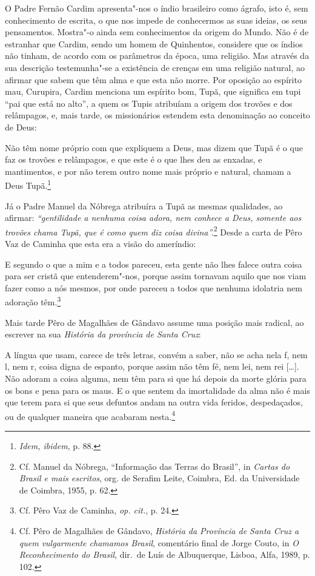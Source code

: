 O Padre Fernão Cardim apresenta"-nos o índio brasileiro como ágrafo,
isto é, sem conhecimento de escrita, o que nos impede de conhecermos as
suas ideias, os seus pensamentos. Mostra"-o ainda sem conhecimentos da
origem do Mundo. Não é de estranhar que Cardim, sendo um homem de
Quinhentos, considere que os índios não tinham, de acordo com os parâmetros
da época, uma religião. Mas através da sua descrição testemunha"-se a
existência de crenças em uma religião natural, ao afirmar que sabem que
têm alma e que esta não morre. Por oposição ao espírito mau,
Curupira, Cardim menciona um espírito bom, Tupã, que
significa em tupi ``pai que está no alto'', a quem os Tupis atribuíam a
origem dos trovões e dos relâmpagos, e, mais tarde, os missionários
estendem esta denominação ao conceito de Deus:

\begin{hedraquote}
Não têm nome próprio com que expliquem a Deus, mas dizem que
Tupã é o que faz os trovões e relâmpagos, e que este é o que lhes deu
as enxadas, e mantimentos, e por não terem outro nome mais próprio e
natural, chamam a Deus Tupã.\footnote{ \textit{Idem, ibidem}, p. 88.} 
\end{hedraquote}

Já o Padre Manuel da Nóbrega atribuíra a Tupã as mesmas qualidades,
ao afirmar: \textit{``gentilidade a nenhuma coisa adora, nem
conhece a Deus, somente aos trovões chama Tupã, que é como quem diz
coisa divina''.}\footnote{ Cf. Manuel da Nóbrega, ``Informação das
Terras do Brasil'', in \textit{Cartas do Brasil e mais escritos}, org.
de Serafim Leite, Coimbra, Ed. da Universidade de Coimbra, 1955, p.
62.} Desde a carta de Pêro Vaz de Caminha que esta era a
visão do ameríndio:

\begin{hedraquote}
E segundo o que a mim e a todos
pareceu, esta gente não lhes falece outra coisa para ser cristã que
entenderem"-nos, porque assim tornavam aquilo que nos viam fazer como a
nós mesmos, por onde pareceu a todos que nenhuma idolatria nem adoração
têm.\footnote{ Cf. Pêro Vaz de Caminha, \textit{op. cit.}, p. 24.}
\end{hedraquote}

Mais tarde Pêro de Magalhães de Gândavo assume uma posição mais radical,
ao escrever na sua \textit{História da província de Santa Cruz}:

\begin{hedraquote} 
[\ldots{}] A língua que usam, carece de três letras, convém
a saber, não se acha nela f, nem l, nem r, coisa digna de espanto, 
porque assim não têm fé, nem lei, nem rei [\ldots{}]. 
Não adoram a coisa alguma, nem têm para si que há depois da
morte glória para os bons e pena para os maus. E o que sentem da
imortalidade da alma não é mais que terem para si que seus defuntos
andam na outra vida feridos, despedaçados, ou de qualquer maneira que
acabaram nesta.\footnote{ Cf. Pêro de Magalhães de Gândavo,
\textit{História da Província de Santa Cruz a quem vulgarmente chamamos
Brasil}, comentário final de Jorge Couto, in \textit{O Reconhecimento do Brasil}, 
dir.~de Luís de Albuquerque, Lisboa, Alfa, 1989, p. 102.} 
\end{hedraquote}

